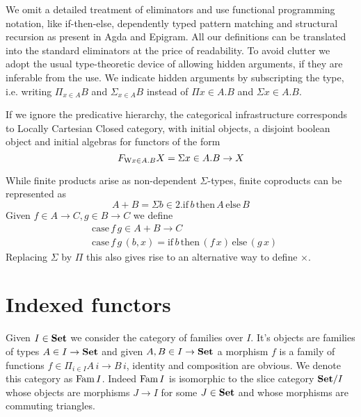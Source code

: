 \documentclass[10pt, conference, compsocconf]{IEEEtran}
\begin{document}
We omit a detailed treatment of eliminators and use functional
programming notation, like if-then-else, dependently typed pattern
matching and structural recursion as present in Agda and Epigram.
All our definitions can be translated into the standard
eliminators at the price of readability.
To avoid clutter we adopt the usual type-theoretic device of allowing
hidden arguments, if they are inferable from the use. We indicate
hidden arguments by subscripting the type, i.e. writing $\Pi_{x\in
  A}B$ and $\Sigma_{x\in A}B$ instead of $\Pi x\in A.B$ and 
$\Sigma x\in A.B$.

If we ignore the predicative hierarchy, the categorical infrastructure
corresponds to Locally Cartesian Closed category, with initial
objects, a disjoint boolean object and initial algebras for 
functors of the form 
\[F_{\mathrm{W} x\in A.B} X = \Sigma x\in A.B\to X \]

While finite products arise as non-dependent $\Sigma$-types, finite
coproducts can be represented as
\[ A + B = \Sigma b\in
2. \mathrm{if}\,b\,\mathrm{then}\,A\,\mathrm{else}\,B\] 
Given $f \in A \to C, g \in B \to C$ we define
\begin{align*}
  & \mathrm{case}\,f\,g \in A+B\to C\\
  & \mathrm{case}\,f\,g\,(b,x) =
\mathrm{if}\,b\,\mathrm{then}\,(f\,x)\,\mathrm{else}\,(g\,x)
\end{align*}
Replacing
$\Sigma$ by $\Pi$ this also gives rise to an alternative way to define
$\times$. 




\section{Indexed functors}
\label{sec:indexed-functors}

\noindent Given $I\in\mathbf{Set}$ we consider the category of families over
$I$. It's objects are families of types $A\in I\to\mathbf{Set}$ and given 
$A,B\in I\to\mathbf{Set}$ a morphism $f$ is a family of functions
$f\in \Pi_{i\in I}A\,i\to B\,i$, identity and composition are
obvious. We denote this category as $\mathrm{Fam}\,I$. Indeed $\mathrm{Fam}\,I$ is
isomorphic to the slice category $\mathbf{Set}/I$ whose objects are morphisms
$J \to I$ for some $J\in\mathbf{Set}$ and whose morphisms are commuting
triangles.
\end{document}
